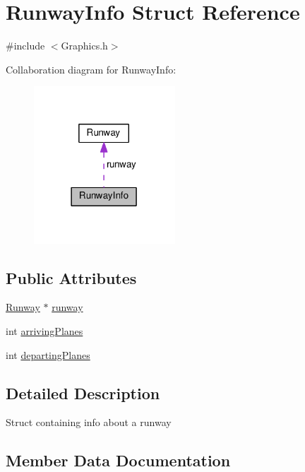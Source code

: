 \hypertarget{structRunwayInfo}{}\section{Runway\+Info Struct Reference}
\label{structRunwayInfo}


{\ttfamily \#include $<$Graphics.\+h$>$}



Collaboration diagram for Runway\+Info\+:
\nopagebreak
\begin{figure}[H]
\begin{center}
\leavevmode
\includegraphics[width=150pt]{structRunwayInfo__coll__graph}
\end{center}
\end{figure}
\subsection*{Public Attributes}
\begin{DoxyCompactItemize}
\item 
\hyperlink{classRunway}{Runway} $\ast$ \hyperlink{structRunwayInfo_a7c0479aadb72e81995b66406971321c3}{runway}
\item 
int \hyperlink{structRunwayInfo_a3e3056a401843e8db5c9a8c08a1a692e}{arriving\+Planes}
\item 
int \hyperlink{structRunwayInfo_afc7873501db8d18cd37dead150a3ecb3}{departing\+Planes}
\end{DoxyCompactItemize}


\subsection{Detailed Description}
Struct containing info about a runway 

\subsection{Member Data Documentation}
